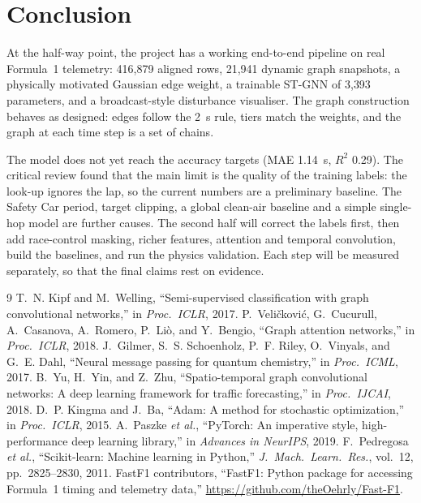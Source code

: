 \documentclass[11pt,a4paper]{article}
\begin{document}
\section{Conclusion}
\label{sec:conclusion}
At the half-way point, the project has a working end-to-end pipeline on real
Formula~1 telemetry: 416{,}879 aligned rows, 21{,}941 dynamic graph
snapshots, a physically motivated Gaussian edge weight, a trainable ST-GNN of
3{,}393 parameters, and a broadcast-style disturbance visualiser. The graph
construction behaves as designed: edges follow the 2~s rule, tiers match the
weights, and the graph at each time step is a set of chains.

The model does not yet reach the accuracy targets (MAE 1.14~s, $R^2$ 0.29).
The critical review found that the main limit is the quality of the training
labels: the look-up ignores the lap, so the current numbers are a preliminary
baseline. The Safety Car period, target clipping, a global clean-air
baseline and a simple single-hop model are further causes. The second half
will correct the labels first, then add race-control masking, richer
features, attention and temporal convolution, build the baselines, and run
the physics validation. Each step will be measured separately, so that the
final claims rest on evidence.

\begin{thebibliography}{9}
 T.~N. Kipf and M.~Welling, ``Semi-supervised classification with graph convolutional networks,'' in \emph{Proc.\ ICLR}, 2017.
 P.~Veli\v{c}kovi\'{c}, G.~Cucurull, A.~Casanova, A.~Romero, P.~Li\`{o}, and Y.~Bengio, ``Graph attention networks,'' in \emph{Proc.\ ICLR}, 2018.
 J.~Gilmer, S.~S. Schoenholz, P.~F. Riley, O.~Vinyals, and G.~E. Dahl, ``Neural message passing for quantum chemistry,'' in \emph{Proc.\ ICML}, 2017.
 B.~Yu, H.~Yin, and Z.~Zhu, ``Spatio-temporal graph convolutional networks: A deep learning framework for traffic forecasting,'' in \emph{Proc.\ IJCAI}, 2018.
 D.~P. Kingma and J.~Ba, ``Adam: A method for stochastic optimization,'' in \emph{Proc.\ ICLR}, 2015.
 A.~Paszke \emph{et al.}, ``PyTorch: An imperative style, high-performance deep learning library,'' in \emph{Advances in NeurIPS}, 2019.
 F.~Pedregosa \emph{et al.}, ``Scikit-learn: Machine learning in Python,'' \emph{J.\ Mach.\ Learn.\ Res.}, vol.~12, pp.~2825--2830, 2011.
 FastF1 contributors, ``FastF1: Python package for accessing Formula~1 timing and telemetry data,'' \url{https://github.com/theOehrly/Fast-F1}.
\end{thebibliography}
\end{document}
